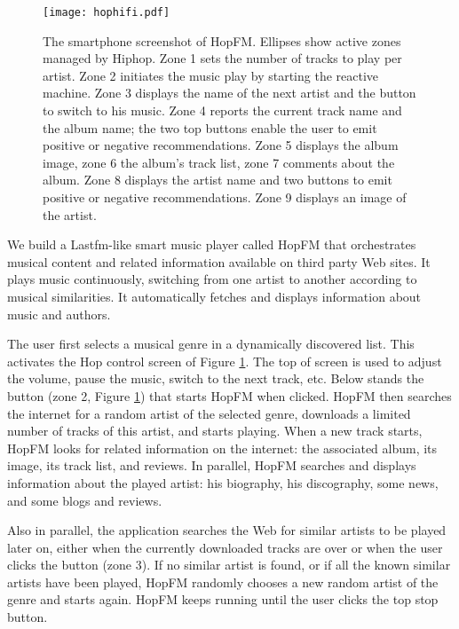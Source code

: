 \documentclass{llncs}
\begin{document}
\begin{figure}[htb]
\begin{center}\texttt{[image: hophifi.pdf]}\end{center} 

\vspace{1ex}
\caption{The smartphone screenshot of HopFM. Ellipses
show active zones managed by Hiphop.  Zone 1 sets
the number of tracks to play per artist.  Zone 2 initiates
the music play by starting the reactive
machine. Zone 3 displays the name of the next artist and the
button to switch to his music. Zone 4 reports
the current track   name and the album name; 
the two top buttons enable the user to emit
positive or negative recommendations.  Zone 5 displays the album
image, zone 6 the album's track list, zone 7
comments about the album. Zone 8 displays the artist name and
two buttons to emit positive or negative recommendations.  Zone
9 displays an image of the artist.
\label{hophifi-fig}}\end{figure}


We build a Lastfm-like smart music player called HopFM that orchestrates
musical content and related information available on third
party Web sites. It plays music continuously, switching from one
artist to another according to musical similarities. It automatically
fetches and displays information about music and authors.

The user first selects a musical genre in a dynamically discovered
list.  This activates the Hop control screen of Figure
\ref{hophifi-fig}. The top of screen is used to adjust the volume,
pause the music, switch to the next track, etc. Below stands the
{\textbf{{\footnotesize{{\footnotesize{}}}}}} button
(zone 2, Figure \ref{hophifi-fig}) that starts HopFM when
clicked. HopFM then searches the internet for a random artist of the
selected genre, downloads a limited number of tracks of this artist,
and starts playing. When a new track starts, HopFM looks for related
information on the internet: the associated album, its image, its
track list, and reviews.  In parallel, HopFM searches and displays
information about the played artist: his biography, his discography,
some news, and some blogs and reviews.

Also in parallel, the application searches the Web for similar artists
to be played later on, either when the currently downloaded tracks are
over or when the user clicks the
{\textbf{{\footnotesize{{\footnotesize{}}}}}} button
(zone 3). If no similar artist is
found, or if all the known similar artists have been played, HopFM
randomly chooses a new random artist of the genre and starts again.
HopFM keeps running until the user clicks the top stop button.
\end{document}

